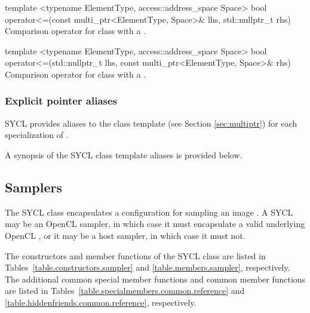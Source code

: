 \addRowTwoL
{template <typename ElementType, access::address_space Space>}
{bool operator<=(const multi_ptr<ElementType, Space>\& lhs, std::nullptr_t rhs)}
{Comparison operator \codeinline{<=} for  class with a
.}

\addRowTwoL
{template <typename ElementType, access::address_space Space>}
{bool operator<=(std::nullptr_t lhs, const multi_ptr<ElementType, Space>\& rhs)}
{Comparison operator \codeinline{<=} for  class with a
.}

\completeTable
\subsubsection{Explicit pointer aliases}
\label{sec:pointerclasses}

SYCL provides aliases to the  class template (see Section
\ref{sec:multiptr}) for each specialization of .

A synopsis of the SYCL  class template 
aliases is provided below.



\subsection{Samplers}
\label{subsec:samplers}

The SYCL  class encapsulates a configuration for sampling an image . A SYCL  may be an OpenCL sampler, in which case it must encapsulate a valid underlying OpenCL , or it may be a host sampler, in which case it must not.

The constructors and member functions of the SYCL  class are listed in Tables~\ref{table.constructors.sampler} and \ref{table.members.sampler}, respectively. The additional common special member functions and common member functions are listed in Tables~\ref{table.specialmembers.common.reference} and \ref{table.hiddenfriends.common.reference}, respectively.

